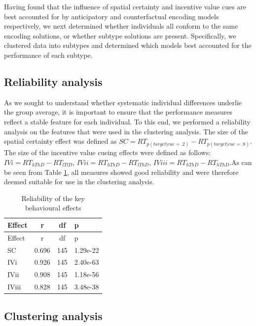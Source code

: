 \documentclass[11pt,halfline,a4paper,]{ouparticle}
\begin{document}
Having found that the influence of spatial certainty and incentive value cues are best accounted for by anticipatory and counterfactual encoding models respectively, we next determined whether individuals all conform to the same encoding solutions, or whether subtype solutions are present. Specifically, we clustered data into subtypes and determined which models best accounted for the performance of each subtype.

\hypertarget{reliability-analysis}{%
\subsection{Reliability analysis}\label{reliability-analysis}}

\label{sec:RelAnalysis}

As we sought to understand whether systematic individual differences underlie the group average, it is important to ensure that the performance measures reflect a stable feature for each individual. To this end, we performed a reliability analysis on the features that were used in the clustering analysis. The size of the spatial certainty effect was defined as \(SC = RT_{p(target|cue = .2)} - RT_{p(target|cue = .8)}\). The size of the incentive value cueing effects were defined as follows: \(IVi = RT_{hThD} - RT_{lTlD}\), \(IVii = RT_{hThD} - RT_{lThD}\), \(IViii = RT_{hThD} - RT_{hThD}\).As can be seen from Table \ref{tab:reliabilityanalysis}, all measures showed good reliability and were therefore deemed suitable for use in the clustering analysis.

\begin{longtable}[]{@{}lccl@{}}
\caption{\label{tab:reliabilityanalysis}Reliability of the key behavioural effects}\tabularnewline
\toprule
Effect & r & df & p \\
\midrule
\endfirsthead
\toprule
Effect & r & df & p \\
\midrule
\endhead
SC & 0.696 & 145 & 1.29e-22 \\
IVi & 0.926 & 145 & 2.40e-63 \\
IVii & 0.908 & 145 & 1.18e-56 \\
IViii & 0.828 & 145 & 3.48e-38 \\
\bottomrule
\end{longtable}

\hypertarget{clustering-analysis}{%
\subsection{Clustering analysis}\label{clustering-analysis}}
\end{document}
